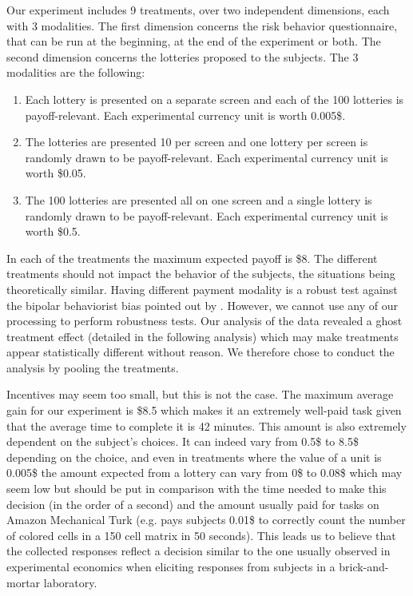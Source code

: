 \documentclass[
]{book}
\providecommand{\tightlist}{%
  \setlength{\itemsep}{0pt}\setlength{\parskip}{0pt}}
\begin{document}
Our experiment includes 9 treatments, over two independent dimensions, each with
3 modalities.
The first dimension concerns the risk behavior questionnaire, that can be run at
the beginning, at the end of the experiment or both.
The second dimension concerns the lotteries proposed to the subjects.
The 3 modalities are the following:

\begin{enumerate}
\def\labelenumi{\arabic{enumi}.}
\tightlist
\item
  Each lottery is presented on a separate screen and each of the 100
  lotteries is payoff-relevant.
  Each experimental currency unit is worth 0.005\$.
\item
  The lotteries are presented 10 per screen and one lottery per screen
  is randomly drawn to be payoff-relevant. Each experimental currency unit
  is worth \$0.05.
\item
  The 100 lotteries are presented all on one screen and a single lottery
  is randomly drawn to be payoff-relevant. Each experimental currency unit
  is worth \$0.5.
\end{enumerate}

In each of the treatments the maximum expected payoff is \$8.
The different treatments should not impact the behavior of the subjects, the
situations being theoretically similar.
Having different payment modality is a robust test against the bipolar
behaviorist bias pointed out by \citet{harrison2014experimental}.
However, we cannot use any of our processing to perform robustness tests.
Our analysis of the data revealed a ghost treatment effect (detailed in the
following analysis) which may make treatments appear statistically different
without reason.
We therefore chose to conduct the analysis by pooling the treatments.

Incentives may seem too small, but this is not the case.
The maximum average gain for our experiment is \$8.5 which
makes it an extremely well-paid task given that the average time to
complete it is 42
minutes.
This amount is also extremely dependent on the subject's choices.
It can indeed vary from 0.5\$ to 8.5\$ depending on the choice,
and even in treatments where the value of a unit is 0.005\$ the amount
expected from a lottery can vary from 0\$ to 0.08\$ which may seem low
but should be put in comparison with the time needed to make this
decision (in the order of a second) and the amount usually paid for
tasks on Amazon Mechanical Turk (e.g. \citet{sjaastad2021ulyssean} pays
subjects 0.01\$ to correctly count the number of colored cells in a 150
cell matrix in 50 seconds). This leads us to believe that the collected
responses reflect a decision similar to the
one usually observed in experimental economics when eliciting
responses from subjects in a brick-and-mortar laboratory.
\end{document}
